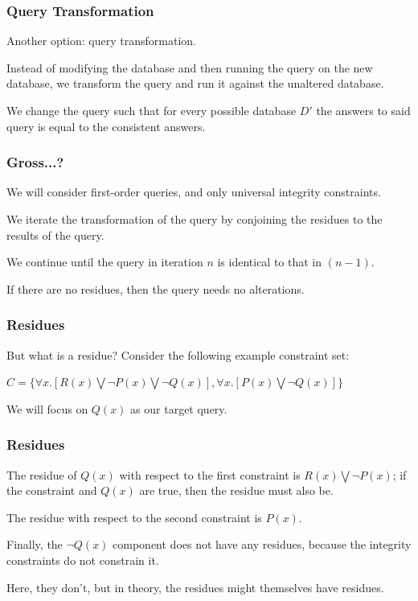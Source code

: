 \begin{frame}
\frametitle{Query Transformation}

Another option: query transformation. 

Instead of modifying the database and then running the query on the new database, we transform the query and run it against the unaltered database. 

We change the query such that for every possible database $D'$ the answers to said query is equal to the consistent answers.


\end{frame}

\begin{frame}
\frametitle{Gross...?}

We will consider first-order queries, and only universal integrity constraints. 

We iterate the transformation of the query by conjoining the \alert{residues} to the results of the query. 

We continue until the query in iteration $n$ is identical to that in $(n-1)$.

If there are no residues, then the query needs no alterations.


\end{frame}

\begin{frame}
\frametitle{Residues}

But what is a residue? Consider the following example constraint set:
\begin{center}
$C = \{\forall x.[R(x) \bigvee \neg P(x) \bigvee \neg Q(x)], \forall x.[P(x) \bigvee \neg Q(x)] \}$ 
\end{center}

We will focus on $Q(x)$ as our target query. 

\end{frame}

\begin{frame}
\frametitle{Residues}

The residue of $Q(x)$ with respect to the first constraint is $R(x) \bigvee \neg P(x)$; if the constraint and $Q(x)$ are true, then the residue must also be. 

The residue with respect to the second constraint is $P(x)$. 

Finally, the $\neg Q(x)$ component does not have any residues, because the integrity constraints do not constrain it. 

Here, they don't, but in theory, the residues might themselves have residues.

\end{frame}

